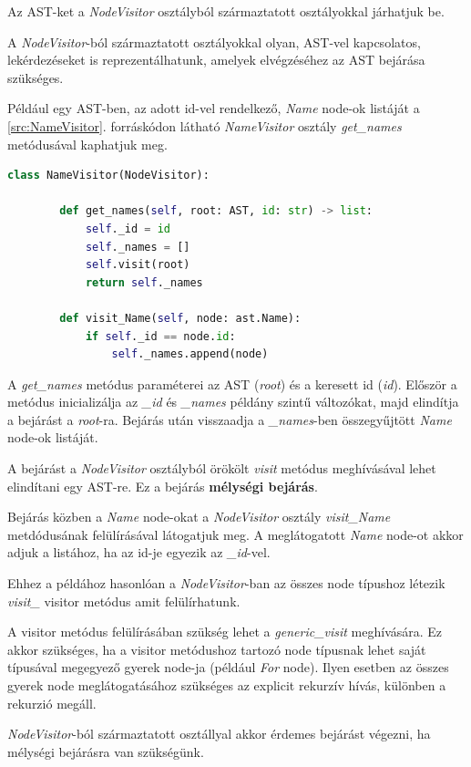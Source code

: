 Az AST-ket a \emph{NodeVisitor} osztályból származtatott osztályokkal járhatjuk be.

A \emph{NodeVisitor}-ból származtatott osztályokkal olyan, AST-vel kapcsolatos,
lekérdezéseket is reprezentálhatunk, amelyek elvégzéséhez az AST bejárása szükséges.

Például egy AST-ben, az adott id-vel rendelkező, \emph{Name} node-ok listáját
a \ref{src:NameVisitor}. forráskódon látható \emph{NameVisitor} osztály
\emph{get\_names} metódusával kaphatjuk meg.

\begin{lstlisting}[language={Python}]
	class NameVisitor(NodeVisitor):
		
		def get_names(self, root: AST, id: str) -> list:
			self._id = id
			self._names = []
			self.visit(root)
			return self._names
		
		def visit_Name(self, node: ast.Name):
			if self._id == node.id:
				self._names.append(node)
\end{lstlisting}

A \emph{get\_names} metódus paraméterei az AST (\emph{root}) és a keresett id (\emph{id}).
Először a metódus inicializálja az \emph{\_id} és \emph{\_names} példány szintű változókat,
majd elindítja a bejárást a \emph{root}-ra.
Bejárás után visszaadja a \emph{\_names}-ben összegyűjtött \emph{Name} node-ok listáját.

A bejárást a \emph{NodeVisitor} osztályból örökölt \emph{visit} metódus meghívásával
lehet elindítani egy AST-re. Ez a bejárás \textbf{mélységi bejárás}.

Bejárás közben a \emph{Name} node-okat a \emph{NodeVisitor} osztály \emph{visit\_Name}
metdódusának felülírásával látogatjuk meg.
A meglátogatott \emph{Name} node-ot akkor adjuk a listához,
ha az id-je egyezik az \emph{\_id}-vel.

Ehhez a példához hasonlóan a \emph{NodeVisitor}-ban az összes node típushoz
létezik \emph{visit\_<node-class>} visitor metódus amit felülírhatunk.

A visitor metódus felülírásában szükség lehet a \emph{generic\_visit} meghívására.
Ez akkor szükséges, ha a visitor metódushoz tartozó node típusnak
lehet saját típusával megegyező gyerek node-ja (például \emph{For} node).
Ilyen esetben az összes gyerek node meglátogatásához szükséges az explicit rekurzív hívás,
különben a rekurzió megáll.

\emph{NodeVisitor}-ból származtatott osztállyal akkor érdemes bejárást végezni,
ha mélységi bejárásra van szükségünk.

